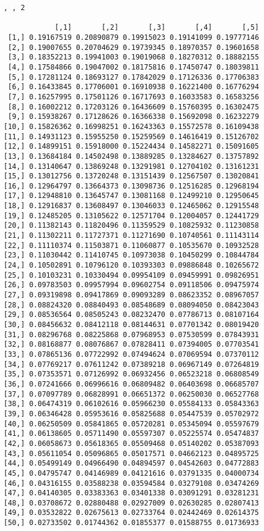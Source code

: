 \documentclass[12pt,english]{article}
\begin{document}
{\begin{multicols}{2}
\begin{Verbatim}[fontsize=\tiny]
, , 2

            [,1]       [,2]       [,3]       [,4]       [,5]
 [1,] 0.19167519 0.20890879 0.19915023 0.19141099 0.19777146
 [2,] 0.19007655 0.20704629 0.19739345 0.18970357 0.19601658
 [3,] 0.18352213 0.19941003 0.19019068 0.18270312 0.18882155
 [4,] 0.17584866 0.19047002 0.18175816 0.17450747 0.18039811
 [5,] 0.17281124 0.18693127 0.17842029 0.17126336 0.17706383
 [6,] 0.16433845 0.17706001 0.16910938 0.16221400 0.16776294
 [7,] 0.16257995 0.17501126 0.16717693 0.16033583 0.16583256
 [8,] 0.16002212 0.17203126 0.16436609 0.15760395 0.16302475
 [9,] 0.15938267 0.17128626 0.16366338 0.15692098 0.16232279
[10,] 0.15826362 0.16998251 0.16243363 0.15572578 0.16109438
[11,] 0.14931123 0.15955250 0.15259569 0.14616419 0.15126702
[12,] 0.14899151 0.15918000 0.15224434 0.14582271 0.15091605
[13,] 0.13684184 0.14502498 0.13889285 0.13284627 0.13757892
[14,] 0.13140647 0.13869248 0.13291981 0.12704102 0.13161231
[15,] 0.13012756 0.13720248 0.13151439 0.12567507 0.13020841
[16,] 0.12964797 0.13664373 0.13098736 0.12516285 0.12968194
[17,] 0.12948810 0.13645747 0.13081168 0.12499210 0.12950645
[18,] 0.12916837 0.13608497 0.13046033 0.12465062 0.12915548
[19,] 0.12485205 0.13105622 0.12571704 0.12004057 0.12441729
[20,] 0.11382143 0.11820496 0.11359529 0.10825932 0.11230858
[21,] 0.11302211 0.11727371 0.11271690 0.10740561 0.11143114
[22,] 0.11110374 0.11503871 0.11060877 0.10535670 0.10932528
[23,] 0.11030442 0.11410745 0.10973038 0.10450299 0.10844784
[24,] 0.10502891 0.10796120 0.10393303 0.09886848 0.10265672
[25,] 0.10103231 0.10330494 0.09954109 0.09459991 0.09826951
[26,] 0.09783503 0.09957994 0.09602754 0.09118506 0.09475974
[27,] 0.09319898 0.09417869 0.09093289 0.08623352 0.08967057
[28,] 0.08824320 0.08840493 0.08548689 0.08094050 0.08423043
[29,] 0.08536564 0.08505243 0.08232470 0.07786713 0.08107164
[30,] 0.08456632 0.08412118 0.08144631 0.07701342 0.08019420
[31,] 0.08296768 0.08225868 0.07968953 0.07530599 0.07843931
[32,] 0.08168877 0.08076867 0.07828411 0.07394005 0.07703541
[33,] 0.07865136 0.07722992 0.07494624 0.07069594 0.07370112
[34,] 0.07769217 0.07611242 0.07389218 0.06967149 0.07264819
[35,] 0.07353571 0.07126992 0.06932456 0.06523218 0.06808549
[36,] 0.07241666 0.06996616 0.06809482 0.06403698 0.06685707
[37,] 0.07097789 0.06828991 0.06651372 0.06250030 0.06527768
[38,] 0.06474319 0.06102616 0.05966230 0.05584133 0.05843363
[39,] 0.06346428 0.05953616 0.05825688 0.05447539 0.05702972
[40,] 0.06250509 0.05841865 0.05720281 0.05345094 0.05597679
[41,] 0.06138605 0.05711490 0.05597307 0.05225574 0.05474837
[42,] 0.06058673 0.05618365 0.05509468 0.05140202 0.05387093
[43,] 0.05611054 0.05096865 0.05017571 0.04662123 0.04895725
[44,] 0.05499149 0.04966490 0.04894597 0.04542603 0.04772883
[45,] 0.04795747 0.04146989 0.04121616 0.03791335 0.04000734
[46,] 0.04316155 0.03588238 0.03594584 0.03279108 0.03474269
[47,] 0.04140305 0.03383363 0.03401338 0.03091291 0.03281231
[48,] 0.03708672 0.02880488 0.02927009 0.02630285 0.02807413
[49,] 0.03532822 0.02675613 0.02733764 0.02442469 0.02614375
[50,] 0.02733502 0.01744362 0.01855377 0.01588755 0.01736933


\end{Verbatim}
\end{multicols}}
\end{document}
